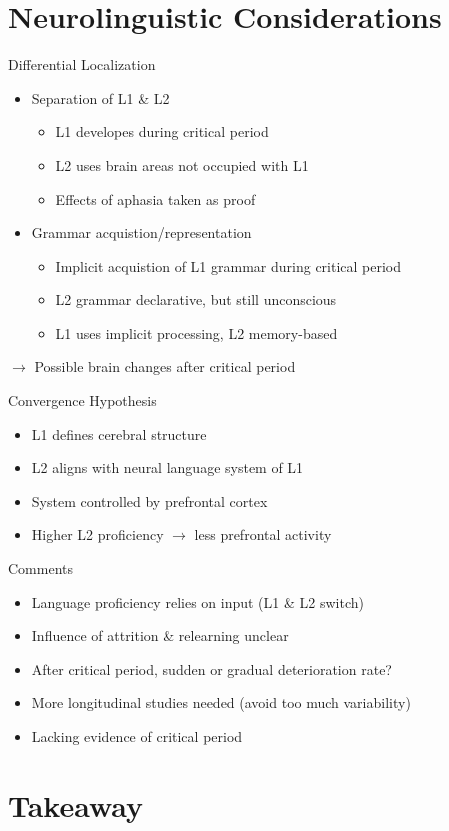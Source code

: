 \documentclass{beamer}
\begin{document}
\section{Neurolinguistic Considerations}

\begin{frame}{Differential Localization}
	\begin{itemize}
		\item Separation of L1 \& L2
		\pause
		\begin{itemize}
			\item L1 developes during critical period
			\item L2 uses brain areas not occupied with L1
			\item Effects of aphasia taken as proof
		\end{itemize}
		\pause
		\item Grammar acquistion/representation
			\begin{itemize}
				\item Implicit acquistion of L1 grammar during critical period
				\item L2 grammar declarative, but still unconscious
				\item L1 uses implicit processing, L2 memory-based
			\end{itemize}
	\end{itemize}
	\pause
	\vspace{0.25cm}
	$\rightarrow$ Possible brain changes after critical period
\end{frame}

\begin{frame}{Convergence Hypothesis}
	\begin{itemize}
		\item L1 defines cerebral structure
		\pause
		\item L2 aligns with neural language system of L1
		\pause
		\item System controlled by prefrontal cortex
		\pause
		\item Higher L2 proficiency $\rightarrow$ less prefrontal activity
	\end{itemize}
\end{frame}

\begin{frame}{Comments}
	\begin{itemize}
		\item Language proficiency relies on input (L1 \& L2 switch)
		\pause
		\item Influence of attrition \& relearning unclear
		\pause
		\item After critical period, sudden or gradual deterioration rate?
		\pause
		\item More longitudinal studies needed (avoid too much variability)
		\pause
		\item Lacking evidence of critical period
	\end{itemize}
\end{frame}

\section{Takeaway}
\end{document}
